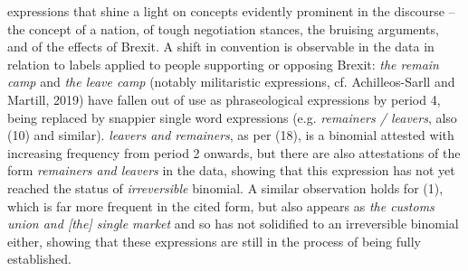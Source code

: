 \documentclass[12pt]{article}
\newenvironment{styleStandard}{\setlength\leftskip{0cm}\setlength\rightskip{0cm plus 1fil}\setlength\parindent{0cm}\setlength\parfillskip{0pt plus 1fil}\setlength\parskip{0in plus 1pt}\writerlistparindent\writerlistleftskip\leavevmode\normalfont\normalsize\writerlistlabel\ignorespaces}{\unskip\vspace{0.111in plus 0.0111in}\par}
\newcommand\writerlistleftskip{}
\newcommand\writerlistparindent{}
\newcommand\writerlistlabel{}
\begin{document}
\begin{styleStandard}
expressions that shine a light on concepts evidently prominent in the discourse – the concept of a nation, of tough negotiation stances, the bruising arguments, and of the effects of Brexit. A shift in convention is observable in the data in relation to labels applied to people supporting or opposing Brexit: \textit{the remain camp} and \textit{the leave camp} (notably militaristic expressions, cf. Achilleos-Sarll and Martill, 2019) have fallen out of use as phraseological expressions by period 4, being replaced by snappier single word expressions (e.g. \textit{remainers / leavers}, also (10) and similar). \textit{leavers and remainers}, as per (18), is a binomial attested with increasing frequency from period 2 onwards, but there are also attestations of the form \textit{remainers and leavers} in the data, showing that this expression has not yet reached the status of \textit{irreversible }binomial. A similar observation holds for (1), which is far more frequent in the cited form, but also appears as \textit{the customs union and [the] single market} and so has not solidified to an irreversible binomial either, showing that these expressions are still in the process of being fully established.
\end{styleStandard}
\end{document}
